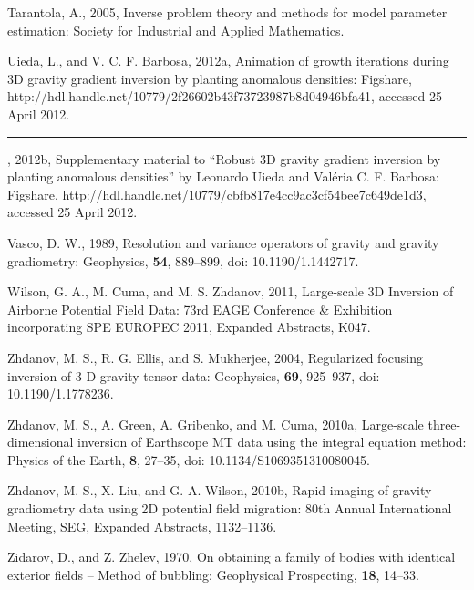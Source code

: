 \begin{thebibliography}{}
Tarantola, A., 2005, Inverse problem theory and methods for model parameter
    estimation: Society for Industrial and Applied Mathematics.
    
Uieda, L., and V. C. F. Barbosa, 2012a, {Animation of growth iterations during 3D
    gravity gradient inversion by planting anomalous densities}: Figshare,
    http://hdl.handle.net/10779/2f26602b43f73723987b8d04946bfa41,
    accessed 25 April 2012.
    
\rule{1cm}{.4pt}, 2012b, {Supplementary material to
    ``Robust 3D gravity gradient inversion by planting anomalous densities''
    by Leonardo Uieda and Val\'eria C. F. Barbosa}: Figshare,
    http://hdl.handle.net/10779/cbfb817e4cc9ac3cf54bee7c649de1d3,
    accessed 25 April 2012.

Vasco, D. W., 1989, Resolution and variance operators of gravity and gravity
    gradiometry: Geophysics, {\bf 54}, 889–899, doi: 10.1190/1.1442717.

Wilson, G. A., M. Cuma, and M. S. Zhdanov, 2011, Large-scale 3D Inversion of
    Airborne Potential Field Data: 73rd EAGE Conference \& Exhibition
    incorporating SPE EUROPEC 2011, Expanded Abstracts, K047.

Zhdanov, M. S., R. G. Ellis, and S. Mukherjee, 2004, Regularized focusing
    inversion of 3-D gravity tensor data: Geophysics, {\bf 69},
    925--937, doi: 10.1190/1.1778236.

Zhdanov, M. S., A. Green, A. Gribenko, and M. Cuma, 2010a, Large-scale
    three-dimensional inversion of Earthscope MT data using the integral
    equation method: Physics of the Earth, {\bf 8}, 27--35,
    doi: 10.1134/S1069351310080045. 

Zhdanov, M. S., X. Liu, and G. A. Wilson, 2010b, Rapid imaging of gravity
    gradiometry data using 2D potential field migration: 80th Annual
    International Meeting, SEG, Expanded Abstracts, 1132--1136.
    
Zidarov, D., and Z. Zhelev, 1970, On obtaining a family of bodies with identical
    exterior fields -- Method of bubbling: Geophysical Prospecting, {\bf 18},
    14--33.
\end{thebibliography}


